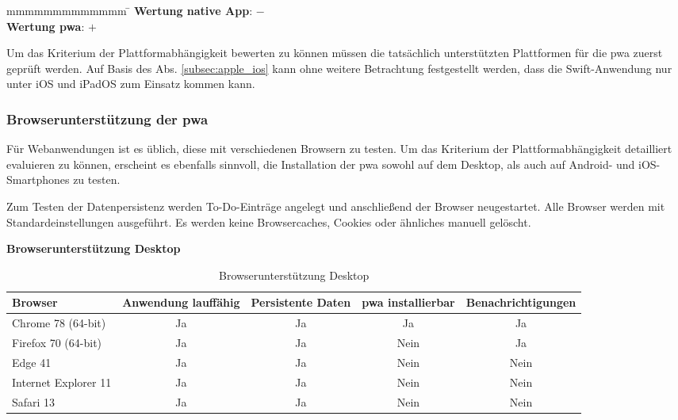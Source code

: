 \begin{tabbing}
	mmmmmmmmmmmmm				\= \kill
	\textbf{Wertung native App}: \> $-$ \\
	\textbf{Wertung \ac{pwa}}: \> $+$
\end{tabbing}


Um das Kriterium der Plattformabhängigkeit bewerten zu können müssen die tatsächlich unterstützten Plattformen für die \ac{pwa} zuerst geprüft werden. Auf Basis des Abs. \ref{subsec:apple_ios} kann ohne weitere Betrachtung festgestellt werden, dass die Swift-Anwendung nur unter iOS und iPadOS zum Einsatz kommen kann.

\subsubsection{Browserunterstützung der \acs{pwa}}
Für Webanwendungen ist es üblich, diese mit verschiedenen Browsern zu testen. Um das Kriterium der Plattformabhängigkeit detailliert evaluieren zu können, erscheint es ebenfalls sinnvoll, die Installation der \ac{pwa} sowohl auf dem Desktop, als auch auf Android- und iOS-Smartphones zu testen.

Zum Testen der Datenpersistenz werden To-Do-Einträge angelegt und anschließend der Browser neugestartet.
Alle Browser werden mit Standardeinstellungen ausgeführt. Es werden keine Browsercaches, Cookies oder ähnliches manuell gelöscht.

\textbf{Browserunterstützung Desktop} 

\begin{table}[h!]
	\centering
	\begin{tabularx}{\textwidth}{|l||C|C|C|c|}
		\hline
		Browser              & Anwendung lauffähig & Persistente Daten & \ac{pwa} installierbar & Benachrichtigungen \\
		\hline
		Chrome 78 (64-bit)   & Ja                  & Ja                & Ja                & Ja                 \\
		Firefox 70 (64-bit)  & Ja                  & Ja                & Nein              & Ja                 \\
		Edge 41    & Ja                  & Ja                & Nein              & Nein               \\
		Internet Explorer 11 & Ja                  & Ja                & Nein              & Nein               \\
		Safari 13            & Ja                  & Ja                & Nein              & Nein               \\
		\hline
	\end{tabularx}
	\caption{Browserunterstützung Desktop} \label{tab:browser_desktop}
\end{table}


